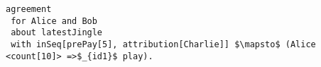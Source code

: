 \lstset{language=Pucella2006}
\begin{minipage}[c]{0.95\textwidth}
\begin{lstlisting}[frame=single, caption={Agreement of Example 2.6}, label={lst:pucellatwosixexampleAST}, mathescape]
agreement
 for Alice and Bob 
 about latestJingle 
 with inSeq[prePay[5], attribution[Charlie]] $\mapsto$ (Alice <count[10]> =>$_{id1}$ play). 
                                    
\end{lstlisting}
\end{minipage} 
%
%
%
%
%
%
%

